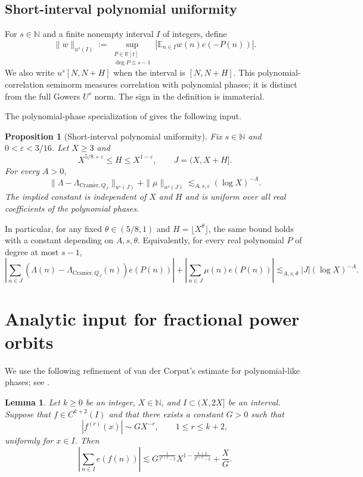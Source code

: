 \documentclass[10pt,leqno]{amsart}
\numberwithin{equation}{section}
\numberwithin{counter2}{section}
\newtheorem{proposition}[subsection]{Proposition}
\newtheorem{lemma}[subsection]{Lemma}
\theoremstyle{definition}
\theoremstyle{plain}
\newcommand{\Cramer}{\operatorname{Cram\acute{e}r}}
\begin{document}
	\subsection{Short-interval polynomial uniformity}
	\label{subsec:short-uniformity}
	
	For $s\in\mathbb N$ and a finite nonempty interval $I$ of
	integers, define
	\[
	\|w\|_{u^s(I)}
	:=\sup_{\substack{P\in\mathbb R[t]\\\deg P\le s-1}}
	\left|\mathbb E_{n\in I}w(n)e(-P(n))\right|.
	\]
	We also write $u^s[N,N+H]$ when the interval is $[N,N+H]$.
	This polynomial-correlation seminorm measures correlation with
	polynomial phases; it is distinct from the full Gowers $U^s$ norm.
	The sign in the definition is immaterial.
	
	The polynomial-phase specialization of
	\cite[Theorem 1.1(i)--(ii)]{Matom_ki_2023} gives the following input.
	
	\begin{proposition}[Short-interval polynomial uniformity]
		\label{prop:short-uniformity}
		Fix $s\in\mathbb N$ and $0<\varepsilon<3/16$.
		Let $X\ge3$ and
		\[
		X^{5/8+\varepsilon}\le H\le X^{1-\varepsilon},
		\qquad J=(X,X+H].
		\]
		For every $A>0$,
		\[
		\|\Lambda-\Lambda_{\Cramer,Q_J}\|_{u^s(J)}
		+\|\mu\|_{u^s(J)}
		\lesssim_{A,s,\varepsilon}(\log X)^{-A}.
		\]
		The implied constant is independent of $X$ and $H$ and is uniform
		over all real coefficients of the polynomial phases.
	\end{proposition}
	
	In particular, for any fixed $\theta\in(5/8,1)$ and
	$H=\lfloor X^\theta\rfloor$, the same bound holds with a constant
	depending on $A,s,\theta$. Equivalently, for every real polynomial
	$P$ of degree at most $s-1$,
	\[
	\left|\sum_{n\in J}
	(\Lambda(n)-\Lambda_{\Cramer,Q_J}(n))e(P(n))\right|
	+\left|\sum_{n\in J}\mu(n)e(P(n))\right|
	\lesssim_{A,s,\theta}|J|(\log X)^{-A}.
	\]

	
	
	\section{Analytic input for fractional power orbits}
	We use the following refinement of van der Corput's estimate for polynomial-like phases; see \cite[Theorem 2.9]{GrahamKolesnik1991}.

   
	\begin{lemma}\label{l:vdc}
		Let \(k\geq 0\) be an integer, \(X\in\mathbb{N}\), and
		\(I\subset (X,2X]\) be an interval. Suppose that
		\(f\in C^{k+2}(I)\) and that there exists a constant
		\(G>0\) such that
		\[
		|f^{(r)}(x)|\sim GX^{-r},
		\qquad 1\leq r\leq k+2,
		\]
		uniformly for \(x\in I\). Then
		\[
		\left|\sum_{n\in I}e(f(n))\right|
		\lesssim
		G^{\frac{1}{2^{k+2}-2}}
		X^{1-\frac{k+2}{2^{k+2}-2}}
		+\frac{X}{G}.
		\]
	\end{lemma}
	
\end{document}
